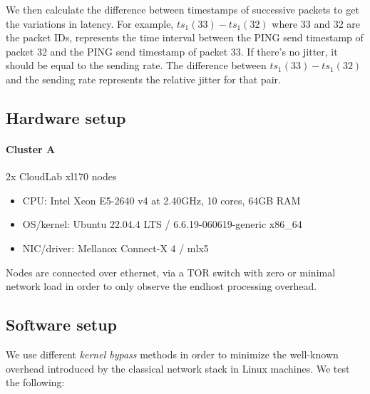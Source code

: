 \documentclass{article}
\begin{document}
We then calculate the difference between timestamps of successive packets
to get the variations in latency. For example, $ts_1(33) - ts_1(32)$ where 33 and
32 are the packet IDs, represents the time interval between the PING send timestamp
of packet 32 and the PING send timestamp of packet 33. If there's no jitter,
it should be equal to the sending rate. The difference between $ts_1(33) - ts_1(32)$
and the sending rate represents the relative jitter for that pair. 

\subsection{Hardware setup}
\paragraph{Cluster A} 2x CloudLab xl170 nodes

\begin{itemize}
  \itemsep=-0.8mm
  \item CPU:  Intel Xeon E5-2640 v4 at 2.40GHz, 10 cores, 64GB RAM
  \item OS/kernel: Ubuntu 22.04.4 LTS / 6.6.19-060619-generic x86\_64
  \item NIC/driver: Mellanox Connect-X 4 / mlx5 
\end{itemize}




Nodes are connected over ethernet, via a TOR switch with zero or minimal network load in order 
to only observe the endhost processing overhead.

\subsection{Software setup}
\label{sec:software}
We use different \textit{kernel bypass} methods in order to minimize the 
well-known overhead introduced by the classical network stack in Linux machines.
We test the following: 
\end{document}
